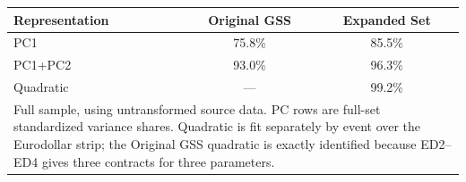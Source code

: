 \begin{tabular}{lcc}
\toprule
Representation & Original GSS & Expanded Set \\
\midrule
PC1 & 75.8\% & 85.5\% \\
PC1+PC2 & 93.0\% & 96.3\% \\
Quadratic & --- & 99.2\% \\
\midrule
\multicolumn{3}{p{0.72\linewidth}}{\footnotesize Full sample, using untransformed source data. PC rows are full-set standardized variance shares. Quadratic is fit separately by event over the Eurodollar strip; the Original GSS quadratic is exactly identified because ED2--ED4 gives three contracts for three parameters.}\\
\bottomrule
\end{tabular}

